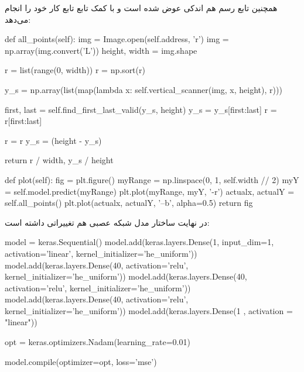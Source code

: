 \documentclass[12pt,titlepage,a4page , tikz , multi,table , svgnames,xcdraw]{article}
\begin{document}
همچنین تابع رسم هم اندکی عوض شده است و با کمک تابع  تابع  کار خود را انجام می‌دهد:


\begin{latin}
\begin{python}[language=Python]


 def all_points(self):
        img = Image.open(self.address, 'r')
        img = np.array(img.convert('L'))
        height, width = img.shape

        r = list(range(0, width))
        r = np.sort(r)

        y_s = np.array(list(map(lambda x:
         self.vertical_scanner(img, x, height), r)))

        first, last = self.find_first_last_valid(y_s, height)
        y_s = y_s[first:last]
        r = r[first:last]

        r = r
        y_s = (height - y_s)

        return r / width, y_s / height

    def plot(self):
        fig = plt.figure()
        myRange = np.linspace(0, 1, self.width // 2)
        myY = self.model.predict(myRange)
        plt.plot(myRange, myY, '-r')
        actualx, actualY = self.all_points()
        plt.plot(actualx, actualY, '--b', alpha=0.5)
        return fig

\end{python}

\end{latin}


در نهایت ساختار مدل شبکه عصبی هم تغییراتی داشته است:

\begin{latin}
\begin{python}[language=Python]


 model = keras.Sequential()
            model.add(keras.layers.Dense(1, input_dim=1,
             activation='linear', kernel_initializer='he_uniform'))
            model.add(keras.layers.Dense(40, activation='relu',
             kernel_initializer='he_uniform'))
            model.add(keras.layers.Dense(40, activation='relu',
             kernel_initializer='he_uniform'))
            model.add(keras.layers.Dense(40, activation='relu',
             kernel_initializer='he_uniform'))
            model.add(keras.layers.Dense(1 , activation = "linear"))

            opt = keras.optimizers.Nadam(learning_rate=0.01)

            model.compile(optimizer=opt, loss='mse')

\end{python}

\end{latin}
\end{document}
